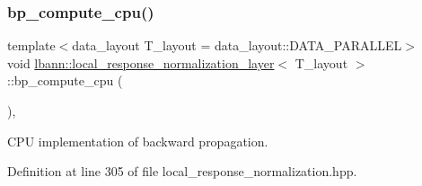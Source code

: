 \subsubsection{\texorpdfstring{bp\+\_\+compute\+\_\+cpu()}{bp\_compute\_cpu()}}
{\footnotesize\ttfamily template$<$data\+\_\+layout T\+\_\+layout = data\+\_\+layout\+::\+D\+A\+T\+A\+\_\+\+P\+A\+R\+A\+L\+L\+EL$>$ \\
void \hyperlink{classlbann_1_1local__response__normalization__layer}{lbann\+::local\+\_\+response\+\_\+normalization\+\_\+layer}$<$ T\+\_\+layout $>$\+::bp\+\_\+compute\+\_\+cpu (\begin{DoxyParamCaption}{ }\end{DoxyParamCaption})\hspace{0.3cm}{\ttfamily [inline]}, {\ttfamily [private]}}



C\+PU implementation of backward propagation. 



Definition at line 305 of file local\+\_\+response\+\_\+normalization.\+hpp.


